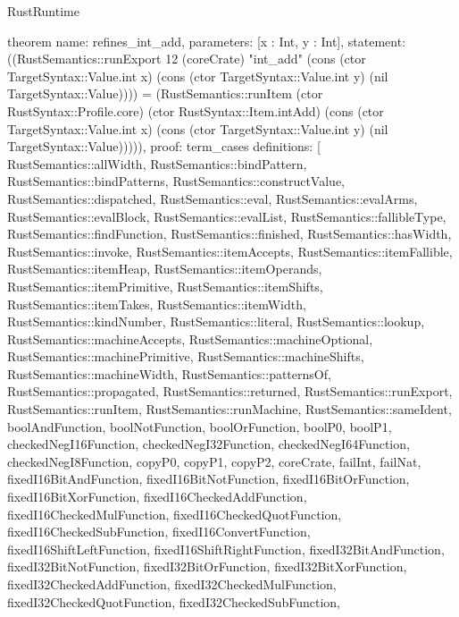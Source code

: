 \begin{lexlean}{RustRuntime}
\begin{semanticmodule}
theorem{
  name: refines_int_add,
  parameters: [x : Int, y : Int],
  statement: ((RustSemantics::runExport 12 (coreCrate) "int_add" (cons (ctor TargetSyntax::Value.int x) (cons (ctor TargetSyntax::Value.int y) (nil TargetSyntax::Value)))) = (RustSemantics::runItem (ctor RustSyntax::Profile.core) (ctor RustSyntax::Item.intAdd) (cons (ctor TargetSyntax::Value.int x) (cons (ctor TargetSyntax::Value.int y) (nil TargetSyntax::Value))))),
  proof: term_cases{
    definitions: [
      RustSemantics::allWidth,
      RustSemantics::bindPattern,
      RustSemantics::bindPatterns,
      RustSemantics::constructValue,
      RustSemantics::dispatched,
      RustSemantics::eval,
      RustSemantics::evalArms,
      RustSemantics::evalBlock,
      RustSemantics::evalList,
      RustSemantics::fallibleType,
      RustSemantics::findFunction,
      RustSemantics::finished,
      RustSemantics::hasWidth,
      RustSemantics::invoke,
      RustSemantics::itemAccepts,
      RustSemantics::itemFallible,
      RustSemantics::itemHeap,
      RustSemantics::itemOperands,
      RustSemantics::itemPrimitive,
      RustSemantics::itemShifts,
      RustSemantics::itemTakes,
      RustSemantics::itemWidth,
      RustSemantics::kindNumber,
      RustSemantics::literal,
      RustSemantics::lookup,
      RustSemantics::machineAccepts,
      RustSemantics::machineOptional,
      RustSemantics::machinePrimitive,
      RustSemantics::machineShifts,
      RustSemantics::machineWidth,
      RustSemantics::patternsOf,
      RustSemantics::propagated,
      RustSemantics::returned,
      RustSemantics::runExport,
      RustSemantics::runItem,
      RustSemantics::runMachine,
      RustSemantics::sameIdent,
      boolAndFunction,
      boolNotFunction,
      boolOrFunction,
      boolP0,
      boolP1,
      checkedNegI16Function,
      checkedNegI32Function,
      checkedNegI64Function,
      checkedNegI8Function,
      copyP0,
      copyP1,
      copyP2,
      coreCrate,
      failInt,
      failNat,
      fixedI16BitAndFunction,
      fixedI16BitNotFunction,
      fixedI16BitOrFunction,
      fixedI16BitXorFunction,
      fixedI16CheckedAddFunction,
      fixedI16CheckedMulFunction,
      fixedI16CheckedQuotFunction,
      fixedI16CheckedSubFunction,
      fixedI16ConvertFunction,
      fixedI16ShiftLeftFunction,
      fixedI16ShiftRightFunction,
      fixedI32BitAndFunction,
      fixedI32BitNotFunction,
      fixedI32BitOrFunction,
      fixedI32BitXorFunction,
      fixedI32CheckedAddFunction,
      fixedI32CheckedMulFunction,
      fixedI32CheckedQuotFunction,
      fixedI32CheckedSubFunction,
}}
\end{semanticmodule}
\end{lexlean}
